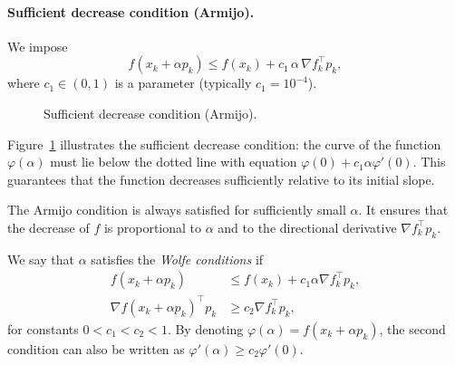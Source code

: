 \paragraph{Sufficient decrease condition (Armijo).}

We impose
\begin{equation}
\label{eq:Armijo}
    f(x_k + \alpha p_k)
    \le f(x_k) + c_1\,\alpha\,\nabla f_k^\top p_k,
\end{equation}
where $c_1 \in (0,1)$ is a parameter (typically $c_1 = 10^{-4}$).

\begin{figure}[H]
\centering
{}
\caption{Sufficient decrease condition (Armijo).}
\label{fig:armijo}
\end{figure}

\begin{figureexplanation}
Figure~\ref{fig:armijo} illustrates the sufficient decrease condition: the curve of the function $\varphi(\alpha)$ must lie below the dotted line with equation $\varphi(0) + c_1 \alpha \varphi'(0)$. This guarantees that the function decreases sufficiently relative to its initial slope.
\end{figureexplanation}

\begin{remarque}
The Armijo condition is always satisfied for sufficiently small $\alpha$.
It ensures that the decrease of $f$ is proportional to $\alpha$ and to the
directional derivative $\nabla f_k^\top p_k$.
\end{remarque}
\begin{definition}
We say that $\alpha$ satisfies the \emph{Wolfe conditions} if
\begin{align}
    f(x_k + \alpha p_k)
    &\le f(x_k) + c_1 \alpha \nabla f_k^\top p_k, \\
    \nabla f(x_k + \alpha p_k)^\top p_k
    &\ge c_2 \nabla f_k^\top p_k,
\end{align}
for constants $0 < c_1 < c_2 < 1$.
By denoting $\varphi(\alpha) = f(x_k + \alpha p_k)$, the second condition
can also be written as $\varphi'(\alpha) \ge c_2 \varphi'(0)$.
\end{definition}


